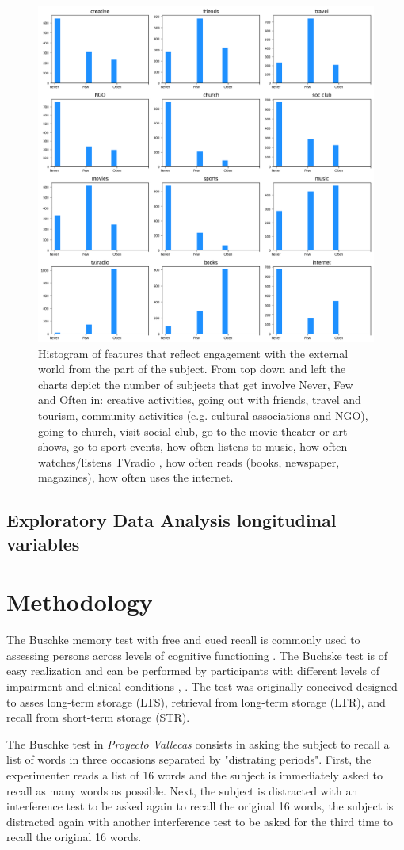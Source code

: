 \documentclass[11pt]{article}
\theoremstyle{definition}
\theoremstyle{remark}
\begin{document}
\begin{figure}[H]
        \centering
        \includegraphics[keepaspectratio, width=0.5\linewidth]{figures/Fig_engage}
        \caption{Histogram of features that reflect engagement with the external world from the part of the subject. From top down and left the charts depict the number of subjects that get involve Never, Few and Often in: creative activities, going out with friends, travel and tourism, community activities (e.g. cultural associations and NGO), going to church, visit social club, go to the movie theater or art shows, go to sport events, how often listens to music, how often watches/listens TVradio , how often reads (books, newspaper, magazines), how often uses the internet.} 
        \label{fig:engage}
\end{figure}

\subsection{Exploratory Data Analysis longitudinal variables}

\section{Methodology}
\label{se:met}
The Buschke memory test with free and cued recall is commonly used to assessing persons across levels of cognitive functioning \cite{buschke1973selective}. The Buchske test is of easy realization and can be performed by participants with different levels of impairment and clinical conditions \cite{o200212}, \cite{leitner2017comparison}. The test was originally conceived designed to asses long-term storage (LTS), retrieval from long-term storage (LTR), and recall from short-term storage (STR).

The Buschke test in \emph{Proyecto Vallecas} consists in asking the subject to recall a list of words in three occasions separated by "distrating periods". First, the experimenter reads a list of 16 words and the subject is immediately asked to recall as many words as possible. Next, the subject is distracted with an interference test to be asked again to recall the original 16 words, the subject is distracted again with another interference test to be asked for the third time to recall the original 16 words.
\end{document}

